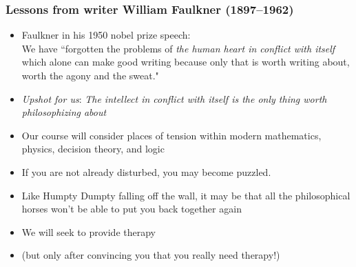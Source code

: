 \begin{frame}
\frametitle{Lessons from writer William Faulkner (1897--1962)}

\begin{itemize}[<+->]

\item Faulkner in his 1950 nobel prize speech: \\ We have ``forgotten the problems of \textit{the human heart in conflict with itself} which alone can make good writing because only that is worth writing about, worth the agony and the sweat."

\item \emph{Upshot for us}: \textit{The intellect in conflict with itself is the only thing worth philosophizing about}

\item Our course will consider places of tension within modern mathematics, physics, decision theory, and logic 

\item If you are not already disturbed, you may become puzzled.

\item Like Humpty Dumpty falling off the wall, it may be that all the philosophical horses won't be able to put you back together again 

\item We will seek to provide therapy 
\item[] (but only after convincing you that you really need therapy!)

\end{itemize}
\end{frame}

